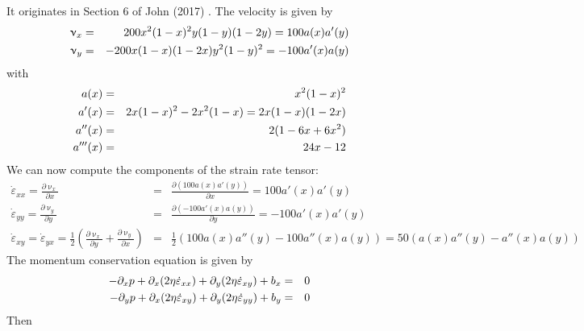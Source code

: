 It originates in Section 6 of John \etal (2017) \cite{jolm17}.
The velocity is given by
\begin{eqnarray}
\upnu_x &=&200 x^2(1-x)^2 y (1-y)(1-2y) = 100 a(x) a'(y) \nonumber\\
\upnu_y &=& - 200 x(1-x)(1-2x)y^2(1-y)^2 = -100 a'(x) a(y) \nonumber
\end{eqnarray}
with 
\begin{eqnarray}
a(x)  &=& x^2(1-x)^2 \nonumber\\
a'(x) &=& 2x(1-x)^2-2x^2(1-x) = 2x(1-x)(1-2x) \nonumber\\
a''(x) &=& 2(1-6x+6x^2) \nonumber\\
a'''(x) &=& 24x-12 \nonumber
\end{eqnarray}
We can now compute the components of the strain rate tensor:
\begin{eqnarray}
\dot{\varepsilon}_{xx}=
\frac{\partial \upnu_x}{\partial x}
&=&\frac{\partial  (100 a(x)a'(y))}{\partial x} =
100 a'(x)a'(y) \nonumber\\
\dot{\varepsilon}_{yy}=
\frac{\partial \upnu_y}{\partial y}
&=& \frac{\partial (-100 a'(x) a(y))}{\partial y}
= -100 a'(x)a'(y) \nonumber\\
\dot{\varepsilon}_{xy}=
\dot{\varepsilon}_{yx}=
\frac12 \left( \frac{\partial \upnu_x}{\partial y}
+\frac{\partial \upnu_y}{\partial x} \right) &=& 
\frac12 \left(100 a(x)a''(y) -100 a''(x) a(y) \right) 
= 50 \left( a(x)a''(y) - a''(x) a(y) \right)
\nonumber
\end{eqnarray}
The momentum conservation equation is given by
\begin{eqnarray}
- \partial_x p + \partial_x (2\eta \dot{\varepsilon}_{xx})
+ \partial_y (2\eta \dot{\varepsilon}_{xy}) + b_x &=&0 \nonumber\\
- \partial_y p + \partial_x (2\eta \dot{\varepsilon}_{xy})
+ \partial_y (2\eta \dot{\varepsilon}_{yy}) + b_y &=&0 \nonumber
\end{eqnarray}
Then 
